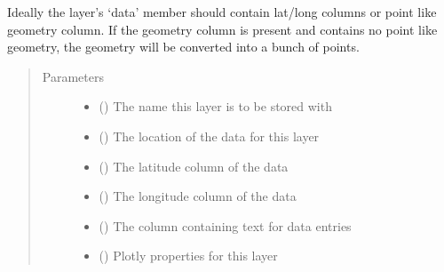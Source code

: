 \documentclass[letterpaper,10pt,english]{sphinxmanual}
\begin{document}
\begin{fulllineitems}
\begin{fulllineitems}
\sphinxAtStartPar
Ideally the layer’s ‘data’ member should contain
lat/long columns or point like geometry column. If the geometry column
is present and contains no point like geometry, the geometry will be converted
into a bunch of points.
\begin{quote}\begin{description}
\item[{Parameters}] \leavevmode\begin{itemize}
\item {} 
\sphinxAtStartPar
{} () \textendash{} The name this layer is to be stored with

\item {} 
\sphinxAtStartPar
{} (\sphinxstyleliteralemphasis{\sphinxupquote{{[}}}\sphinxstyleliteralemphasis{\sphinxupquote{, }}\sphinxstyleliteralemphasis{\sphinxupquote{, }}\sphinxstyleliteralemphasis{\sphinxupquote{{]}}}) \textendash{} The location of the data for this layer

\item {} 
\sphinxAtStartPar
{} () \textendash{} The latitude column of the data

\item {} 
\sphinxAtStartPar
{} () \textendash{} The longitude column of the data

\item {} 
\sphinxAtStartPar
{} () \textendash{} The column containing text for data entries

\item {} 
\sphinxAtStartPar
{} () \textendash{} Plotly properties for this layer

\end{itemize}

\end{description}\end{quote}


\end{fulllineitems}
\end{fulllineitems}
\end{document}
